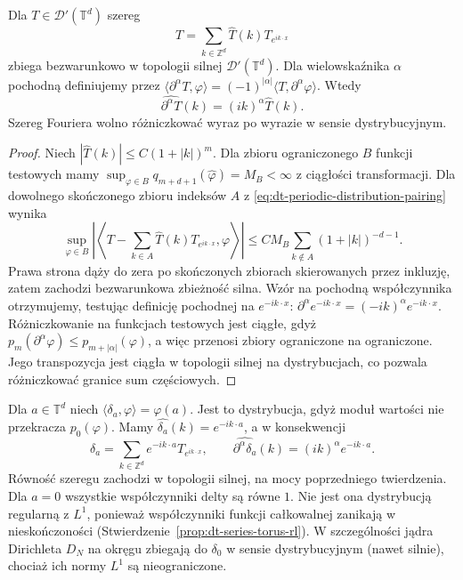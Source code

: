 \begin{twierdzenie}
\label{thm:dt-periodic-distribution-series}
Dla $T\in\mathcal D'(\mathbb T^d)$ szereg
\[
 T=\sum_{k\in\mathbb Z^d}\widehat T(k)T_{e^{ik\cdot x}}
\]
zbiega bezwarunkowo w topologii silnej
$\mathcal D'(\mathbb T^d)$.
Dla wielowskaźnika $\alpha$ pochodną definiujemy
przez $\langle\partial^\alpha T,\varphi\rangle
=(-1)^{|\alpha|}\langle T,\partial^\alpha\varphi\rangle$.
Wtedy
\[
 \widehat{\partial^\alpha T}(k)
 =(ik)^\alpha\widehat T(k).
\]
Szereg Fouriera wolno różniczkować wyraz po wyrazie
w sensie dystrybucyjnym.
\end{twierdzenie}
\begin{proof}
Niech $|\widehat T(k)|\le C(1+|k|)^m$.
Dla zbioru ograniczonego $B$ funkcji testowych
mamy $\sup_{\varphi\in B}q_{m+d+1}(\widehat\varphi)
=M_B<\infty$ z ciągłości transformacji.
Dla dowolnego skończonego zbioru indeksów $A$
z \eqref{eq:dt-periodic-distribution-pairing} wynika
\[
 \sup_{\varphi\in B}
 \left|\left\langle T-\sum_{k\in A}\widehat T(k)
 T_{e^{ik\cdot x}},\varphi\right\rangle\right|
 \le CM_B\sum_{k\notin A}(1+|k|)^{-d-1}.
\]
Prawa strona dąży do zera po skończonych zbiorach
skierowanych przez inkluzję, zatem zachodzi
bezwarunkowa zbieżność silna.
Wzór na pochodną współczynnika otrzymujemy,
testując definicję pochodnej na $e^{-ik\cdot x}$:
$\partial^\alpha e^{-ik\cdot x}=(-ik)^\alpha e^{-ik\cdot x}$.
Różniczkowanie na funkcjach testowych jest ciągłe,
gdyż $p_m(\partial^\alpha\varphi)\le p_{m+|\alpha|}(\varphi)$,
a więc przenosi zbiory ograniczone na ograniczone.
Jego transpozycja jest ciągła w topologii silnej
na dystrybucjach, co pozwala różniczkować granice
sum częściowych.
\end{proof}

\begin{przyklad}
\label{ex:dt-periodic-delta-fourier}
Dla $a\in\mathbb T^d$ niech
$\langle\delta_a,\varphi\rangle=\varphi(a)$.
Jest to dystrybucja, gdyż moduł wartości
nie przekracza $p_0(\varphi)$.
Mamy $\widehat{\delta_a}(k)=e^{-ik\cdot a}$,
a w konsekwencji
\[
 \delta_a=\sum_{k\in\mathbb Z^d}e^{-ik\cdot a}T_{e^{ik\cdot x}},
 \qquad
 \widehat{\partial^\alpha\delta_a}(k)
 =(ik)^\alpha e^{-ik\cdot a}.
\]
Równość szeregu zachodzi w topologii silnej,
na mocy poprzedniego twierdzenia.
Dla $a=0$ wszystkie współczynniki delty są równe $1$.
Nie jest ona dystrybucją regularną z $L^1$,
ponieważ współczynniki funkcji całkowalnej
zanikają w nieskończoności
(Stwierdzenie~\ref{prop:dt-series-torus-rl}).
W szczególności jądra Dirichleta
$D_N$ na okręgu zbiegają do $\delta_0$
w sensie dystrybucyjnym (nawet silnie),
chociaż ich normy $L^1$ są nieograniczone.
\end{przyklad}


